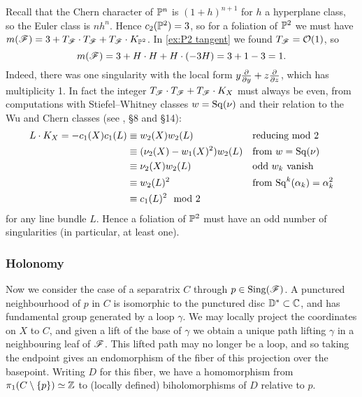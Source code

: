 \begin{example}
    Recall that the Chern character of $\P^n$ is $(1+h)^{n+1}$ for $h$ a
    hyperplane class, so the Euler class is $nh^n$. Hence $c_2(\P^2)=3$, so for
    a foliation of $\P^2$ we must have
    $m(\scrF)=3+T_\scrF\cdot T_\scrF+T_\scrF\cdot K_{\P^2}$. In
    \cref{ex:P2 tangent} we found $T_\scrF=\O(1)$, so
    \begin{equation*}
        m(\scrF) = 3 + H\cdot H + H\cdot(-3H) = 3 + 1 - 3 = 1.
    \end{equation*}
    Indeed, there was one singularity with the local form
    $y\pdv{}{y}+z\pdv{}{z}$, which has multiplicity 1. In fact the integer
    $T_\scrF\cdot T_\scrF+T_\scrF\cdot K_X$ must always be even, from
    computations with Stiefel--Whitney classes $w=\Sq(\nu)$ and their relation
    to the Wu and Chern classes (see \cite{milnor_book}, \S8 and \S14):
    \begin{align*}
        L\cdot K_X
            = -c_1(X)c_1(L)
            &\equiv w_2(X)w_2(L)
            & &\text{reducing mod 2} \\
            &\equiv (\nu_2(X)-w_1(X)^2)w_2(L)
            & &\text{from $w=\Sq(\nu)$} \\
            &\equiv \nu_2(X)w_2(L)
            & &\text{odd $w_k$ vanish} \\
            &\equiv w_2(L)^2 
            & &\text{from $\Sq^k(\alpha_k)=\alpha_k^2$} \\
            &\equiv c_1(L)^2 \mod2
    \end{align*}
    for any line bundle $L$. Hence a foliation of $\P^2$ must have an odd number
    of singularities (in particular, at least one).
\end{example}

\subsubsection{Holonomy}

Now we consider the case of a separatrix $C$ through $p\in\Sing(\scrF)$. A
punctured neighbourhood of $p$ in $C$ is isomorphic to the punctured disc
$\D^*\subset\C$, and has fundamental group generated by a loop $\gamma$. We may
locally project the coordinates on $X$ to $C$, and given a lift of the base of
$\gamma$ we obtain a unique path lifting $\gamma$ in a neighbouring leaf of
$\scrF$. This lifted path may no longer be a loop, and so taking the endpoint
gives an endomorphism of the fiber of this projection over the basepoint.
Writing $D$ for this fiber, we have a homomorphism from
$\pi_1(C\setminus\{p\})\simeq\Z$ to (locally defined) biholomorphisms of $D$
relative to $p$.

